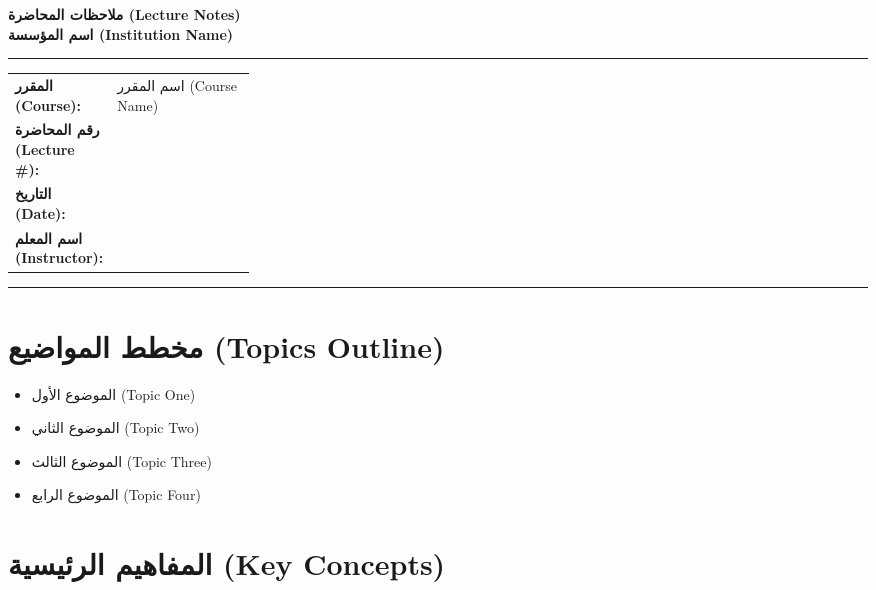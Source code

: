 \documentclass[11pt,a4paper]{article}
\newcommand{\sectiondivider}{%
  \par\noindent{\color{accent}\rule{\linewidth}{0.8pt}}\par\vspace{0.4em}%
}
\begin{document}
\begin{center}
{\LARGE\bfseries ملاحظات المحاضرة (Lecture Notes)}\\[0.4em]
{\large\bfseries اسم المؤسسة (Institution Name)}
\end{center}

\vspace{0.3em}
{\color{accent}\rule{\linewidth}{1.2pt}}
\vspace{0.5em}

\noindent
\begin{tabularx}{\linewidth}{@{}p{0.28\linewidth}X@{}}
\textbf{المقرر (Course):} & %
اسم المقرر (Course Name) \\
\textbf{رقم المحاضرة (Lecture \#):} & %
\hrulefill \\
\textbf{التاريخ (Date):} & %
\hrulefill \\
\textbf{اسم المعلم (Instructor):} & %
\hrulefill \\
\end{tabularx}

\vspace{0.4em}
{\color{accent}\rule{\linewidth}{0.8pt}}
\vspace{0.6em}

\section{مخطط المواضيع (Topics Outline)}
\sectiondivider
\begin{itemize}[leftmargin=2em, itemsep=0.2em]
  \item الموضوع الأول (Topic One)
  \item الموضوع الثاني (Topic Two)
  \item الموضوع الثالث (Topic Three)
  \item الموضوع الرابع (Topic Four)
\end{itemize}

\section{المفاهيم الرئيسية (Key Concepts)}
\sectiondivider
\end{document}
